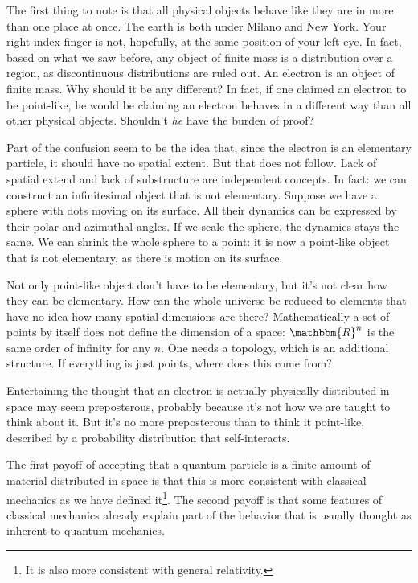 \documentclass[aps,pra,10pt,twocolumn,floatfix,nofootinbib]{revtex4-1}
\numberwithin{equation}{section}
\theoremstyle{definition}
\begin{document}
The first thing to note is that all physical objects behave like they are in more than one place at once. The earth is both under Milano and New York. Your right index finger is not, hopefully, at the same position of your left eye. In fact, based on what we saw before, any object of finite mass is a distribution over a region, as discontinuous distributions are ruled out. An electron is an object of finite mass. Why should it be any different? In fact, if one claimed an electron to be point-like, he would be claiming an electron behaves in a different way than all other physical objects. Shouldn't \emph{he} have the burden of proof? 

Part of the confusion seem to be the idea that, since the electron is an elementary particle, it should have no spatial extent. But that does not follow. Lack of spatial extend and lack of substructure are independent concepts. In fact: we can construct an infinitesimal object that is not elementary. Suppose we have a sphere with dots moving on its surface. All their dynamics can be expressed by their polar and azimuthal angles. If we scale the sphere, the dynamics stays the same. We can shrink the whole sphere to a point: it is now a point-like object that is not elementary, as there is motion on its surface.

Not only point-like object don't have to be elementary, but it's not clear how they can be elementary. How can the whole universe be reduced to  elements that have no idea how many spatial dimensions are there? Mathematically a set of points by itself does not define the dimension of a space: $\mathbbm{R}^n$ is the same order of infinity for any $n$. One needs a topology, which is an additional structure. If everything is just points, where does this come from?

Entertaining the thought that an electron is actually physically distributed in space may seem preposterous, probably because it's not how we are taught to think about it. But it's no more preposterous than to think it point-like, described by a probability distribution that self-interacts.

The first payoff of accepting that a quantum particle is a finite amount of material distributed in space is that this is more consistent with classical mechanics as we have defined it\footnote{It is also more consistent with general relativity.}. The second payoff is that some features of classical mechanics already explain part of the behavior that is usually thought as inherent to quantum mechanics.
\end{document}
